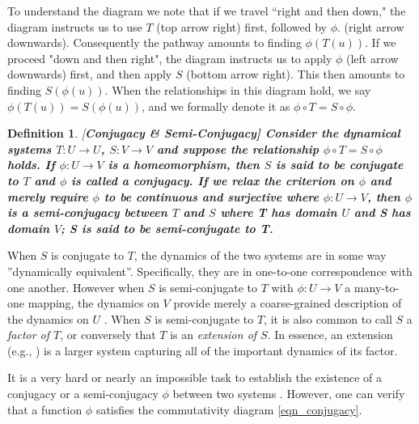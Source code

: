 \documentclass[a4paper,12pt,twoside]{report}
\newtheorem{Definition}{Definition}[]
\begin{document}
To understand the diagram we note that if we travel ``right and then down," the diagram instructs us to use $T$ (top arrow right) first, followed by $\phi$. (right arrow downwards). Consequently the pathway amounts to finding $\phi(T(u))$. If we proceed "down and then right", the diagram instructs us to apply $\phi$ (left arrow downwards) first, and then apply $S$ (bottom arrow right). This then amounts to finding  $S(\phi(u))$. When the relationships in this diagram hold, we say $\phi(T(u))= S(\phi(u))$, and we formally denote it as $\phi \circ T=S\circ \phi$.

\begin{Definition}\rm  
[\bf {Conjugacy \& Semi-Conjugacy}]\label{Dfn_Conjugate}\rm
   Consider the dynamical systems $T:U\to{U}$, $S:V\to{V}$ and suppose the relationship $\phi \circ T=S\circ \phi$ holds. If $\phi:U\to{V}$ is a homeomorphism, then $S$ is said to be conjugate to $T$ and $\phi$ is called a conjugacy. If we relax the criterion on $\phi$ and merely require $\phi$ to be continuous and surjective where $\phi:U\to{V}$, then $\phi$ is a semi-conjugacy between $T$ and $S$ where T has domain $U$ and S has domain $V$; S is said to be semi-conjugate to T. 
\end{Definition} 

When $S$ is conjugate to $T$, the dynamics of the two systems are in some way ''dynamically equivalent''. Specifically, they are in one-to-one correspondence with one another. However when $S$ is semi-conjugate to $T$ with $\phi:U\to{V}$ a many-to-one mapping, the dynamics on $V$ provide merely a coarse-grained description of the dynamics on $U$ \cite{de2013elements}. When $S$ is semi-conjugate to $T$, it is also common to call $S$ a \emph{factor of $T$}, or conversely that $T$ is an \emph{extension of $S$}. In essence, an extension (e.g., \cite{de2013elements}) is a larger system capturing all of the important dynamics of its factor.

It is a very hard or nearly an impossible task to establish the existence of a conjugacy or a semi-conjugacy $\phi$ between two systems \cite{devaney2018introduction}. However, one can verify that a function $\phi$ satisfies the commutativity diagram \ref{eqn_conjugacy}.  
\end{document}
